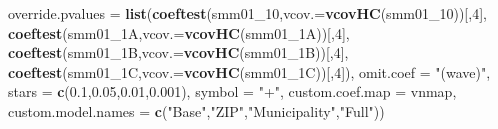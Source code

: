 \documentclass[
]{article}
\newenvironment{Shaded}{\begin{snugshade}}{\end{snugshade}}
\newcommand{\DataTypeTok}[1]{\textcolor[rgb]{0.13,0.29,0.53}{#1}}
\newcommand{\DecValTok}[1]{\textcolor[rgb]{0.00,0.00,0.81}{#1}}
\newcommand{\FloatTok}[1]{\textcolor[rgb]{0.00,0.00,0.81}{#1}}
\newcommand{\KeywordTok}[1]{\textcolor[rgb]{0.13,0.29,0.53}{\textbf{#1}}}
\newcommand{\NormalTok}[1]{#1}
\newcommand{\StringTok}[1]{\textcolor[rgb]{0.31,0.60,0.02}{#1}}
\begin{document}
\begin{Shaded}
\begin{Highlighting}[]
          \DataTypeTok{override.pvalues =} \KeywordTok{list}\NormalTok{(}\KeywordTok{coeftest}\NormalTok{(smm01_}\DecValTok{10}\NormalTok{,}\DataTypeTok{vcov.=}\KeywordTok{vcovHC}\NormalTok{(smm01_}\DecValTok{10}\NormalTok{))[,}\DecValTok{4}\NormalTok{],}
                                  \KeywordTok{coeftest}\NormalTok{(smm01_1A,}\DataTypeTok{vcov.=}\KeywordTok{vcovHC}\NormalTok{(smm01_1A))[,}\DecValTok{4}\NormalTok{],}
                                  \KeywordTok{coeftest}\NormalTok{(smm01_1B,}\DataTypeTok{vcov.=}\KeywordTok{vcovHC}\NormalTok{(smm01_1B))[,}\DecValTok{4}\NormalTok{],}
                                  \KeywordTok{coeftest}\NormalTok{(smm01_1C,}\DataTypeTok{vcov.=}\KeywordTok{vcovHC}\NormalTok{(smm01_1C))[,}\DecValTok{4}\NormalTok{]),}
          \DataTypeTok{omit.coef =} \StringTok{"(wave)"}\NormalTok{, }\DataTypeTok{stars =} \KeywordTok{c}\NormalTok{(}\FloatTok{0.1}\NormalTok{,}\FloatTok{0.05}\NormalTok{,}\FloatTok{0.01}\NormalTok{,}\FloatTok{0.001}\NormalTok{), }\DataTypeTok{symbol =} \StringTok{"+"}\NormalTok{,}
          \DataTypeTok{custom.coef.map =}\NormalTok{ vnmap, }
          \DataTypeTok{custom.model.names =} \KeywordTok{c}\NormalTok{(}\StringTok{"Base"}\NormalTok{,}\StringTok{"ZIP"}\NormalTok{,}\StringTok{"Municipality"}\NormalTok{,}\StringTok{"Full"}\NormalTok{))}
\end{Highlighting}
\end{Shaded}
\end{document}
